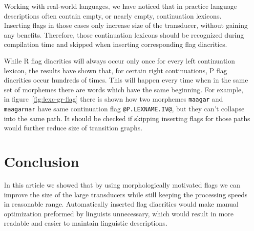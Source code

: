 \documentclass[11pt]{article}
\begin{document}
Working with real-world languages, we have noticed that in practice language descriptions often contain empty, or nearly empty, continuation lexicons. Inserting flags in those cases only increase size of the transducer, without gaining any benefits. Therefore, those continuation lexicons should be recognized during compilation time and skipped when inserting corresponding flag diacritics.

While R flag diacritics will always occur only once for every left continuation lexicon, the results have shown that, for certain right continuations, P flag diacritics occur hundreds of times. This will happen every time when in the same set of morphemes there are words which have the same beginning. For example, in figure~\ref{fig:lexc-gr-flag} there is shown how two morphemes \texttt{maagar} and \texttt{maagarnar} have same continuation flag \verb+@P.LEXNAME.IV@+, but they can't collapse into the same path. It should be checked if skipping inserting flags for those paths would further reduce size of transition graphs.






\section{Conclusion}
\label{sec:conclusion}

In this article we showed that by using morphologically motivated flags we can
improve the size of the large transducers while still keeping the processing speeds in reasonable range. 
Automatically inserted flag diacritics would make manual optimization preformed by linguists unnecessary, which would result in  
more readable and easier to maintain linguistic descriptions.

\end{document}
